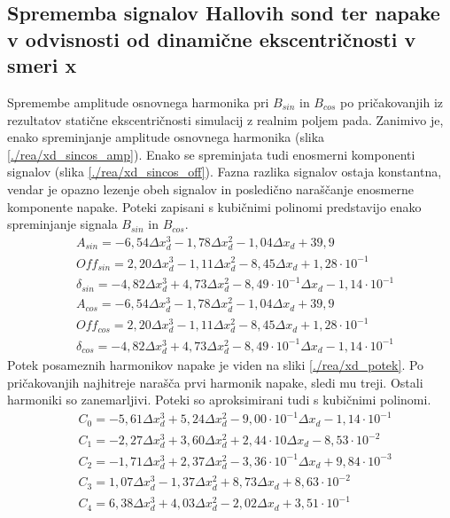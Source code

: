 \subsection{Sprememba signalov Hallovih sond ter napake v odvisnosti od dinamične ekscentričnosti v smeri x}
Spremembe amplitude osnovnega harmonika pri $B_{sin}$ in $B_{cos}$ po pričakovanjih iz rezultatov statične ekscentričnosti simulacij z realnim poljem pada. Zanimivo je, enako spreminjanje amplitude osnovnega harmonika (slika \ref{./rea/xd_sincos_amp}). Enako se spreminjata tudi enosmerni komponenti signalov (slika \ref{./rea/xd_sincos_off}). Fazna razlika signalov ostaja konstantna, vendar je opazno lezenje obeh signalov in posledično naraščanje enosmerne komponente napake.
Poteki zapisani s kubičnimi polinomi predstavijo enako spreminjanje signala $B_{sin}$ in $B_{cos}$.
\begin{eqnarray}
&A_{sin} = -6,54\Delta x_d^3-1,78\Delta x_d^2-1,04\Delta x_d+39,9\\     
&Off_{sin} = 2,20\Delta x_d^3-1,11\Delta x_d^2-8,45\Delta x_d+1,28\cdot 10^{-1}\\   
&\delta_{sin} = -4,82\Delta x_d^3+4,73\Delta x_d^2-8,49\cdot 10^{-1}\Delta x_d-1,14\cdot 10^{-1}\\
&A_{cos} = -6,54\Delta x_d^3-1,78\Delta x_d^2-1,04\Delta x_d+39,9\\     
&Off_{cos} = 2,20\Delta x_d^3-1,11\Delta x_d^2-8,45\Delta x_d+1,28\cdot 10^{-1}\\   
&\delta_{cos} = -4,82\Delta x_d^3+4,73\Delta x_d^2-8,49\cdot 10^{-1}\Delta x_d-1,14\cdot 10^{-1}
\end{eqnarray}
Potek posameznih harmonikov napake je viden na sliki \ref{./rea/xd_potek}. Po pričakovanjih najhitreje narašča prvi harmonik napake, sledi mu treji. Ostali harmoniki so zanemarljivi. Poteki so aproksimirani tudi s kubičnimi polinomi.
\begin{eqnarray}
&C_0 =-5,61\Delta x_d^{3}+5,24\Delta x_d^{2}-9,00\cdot 10^{-1}\Delta x_d-1,14\cdot 10^{-1} \\
&C_1 =-2,27\Delta x_d^{3}+3,60\Delta x_d^{2}+2,44\cdot 10\Delta x_d-8,53\cdot 10^{-2} \\     
&C_2 =-1,71\Delta x_d^{3}+2,37\Delta x_d^{2}-3,36\cdot 10^{-1}\Delta x_d+9,84\cdot 10^{-3} \\
&C_3 =1,07\Delta x_d^{3}-1,37\Delta x_d^{2}+8,73\Delta x_d+8,63\cdot 10^{-2} \\              
&C_4 =6,38\Delta x_d^{3}+4,03\Delta x_d^{2}-2,02\Delta x_d+3,51\cdot 10^{-1}       
\end{eqnarray}
